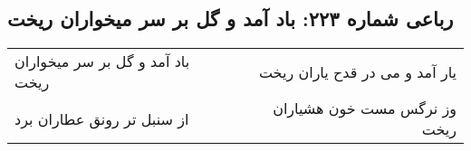 \begin{center}
\section*{رباعی شماره ۲۲۳: باد آمد و گل بر سر میخواران ریخت}
\label{sec:0223}
\begin{longtable}{l p{0.5cm} r}
باد آمد و گل بر سر میخواران ریخت
&&
یار آمد و می در قدح یاران ریخت
\\
از سنبل تر رونق عطاران برد
&&
وز نرگس مست خون هشیاران ریخت
\\
\end{longtable}
\end{center}
